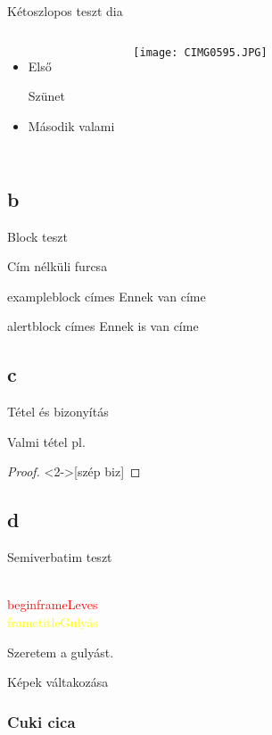 \documentclass[aspectratio=169]{beamer}
\begin{document}
\begin{frame}{Kétoszlopos teszt dia}
    \begin{columns}
            \begin{itemize}
                \item Első 
                
                \pause Szünet
                \item Második valami
            \end{itemize}
            
            \texttt{[image: CIMG0595.JPG]}
    \end{columns}
\end{frame}

\subsection{b}

\begin{frame}{Block teszt}
    \begin{block}
        Cím nélküli furcsa
    \end{block}
    \begin{exampleblock}{exampleblock címes}
        Ennek van címe
    \end{exampleblock}
    \begin{alertblock}{alertblock címes}
        Ennek is van címe
    \end{alertblock}
\end{frame}

\subsection{c}

\begin{frame}{Tétel és bizonyítás}
    \begin{theorem}
        Valmi tétel pl.
    \end{theorem}
    \begin{proof}<2->[szép biz]
        \hulipsum[1]
    \end{proof}
\end{frame}

\subsection{d}

\begin{frame}[fragile]{Semiverbatim teszt}
\transfade
    \begin{semiverbatim}
            \textcolor{red}{\\begin{frame}{Leves}}
            \textcolor{yellow}{\\frametitle{Gulyás}}
    
    Szeretem a gulyást.
    \end{semiverbatim}
\end{frame}

\begin{frame}{Képek váltakozása}
    \frametitle{Cuki cica}

\end{frame}
\end{document}
